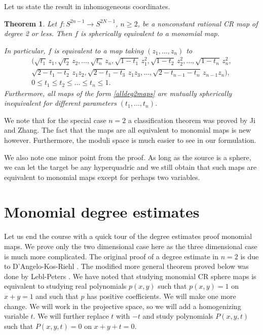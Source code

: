 \documentclass[12pt,openany]{book}
\newcommand{\sectionnewpage}{}
\theoremstyle{plain}
\newtheorem{thm}{Theorem}[section]
\theoremstyle{remark}
\theoremstyle{definition}
\theoremstyle{exercise}
\theoremstyle{example}
\begin{document}
Let us state the result in inhomogeneous coordinates.

\begin{thm} \label{thm:deg2class}
Let $f \colon S^{2n-1} \to S^{2N-1}$, $n \geq 2$, be a nonconstant
rational CR map
of degree 2 or less.  Then $f$ 
is spherically equivalent to a monomial map.

In particular, $f$ is equivalent to a map taking $(z_1,\ldots,z_n)$ to
\begin{multline} \label{alldeg2maps}
\bigl(
\sqrt{t_1} \, z_1 , 
\sqrt{t_2} \, z_2 , 
\ldots ,
\sqrt{t_n} \, z_n , 
\sqrt{1-t_1} \, z_1^2 , 
\sqrt{1-t_2} \, z_2^2 , 
\ldots ,
\sqrt{1-t_n} \, z_n^2 , 
\\
\sqrt{2-t_1-t_2} \, z_1z_2 , 
\sqrt{2-t_1-t_3} \, z_1z_3 , 
\ldots ,
\sqrt{2-t_{n-1}-t_n} \, z_{n-1}z_n \bigr) , 
\\
0 \leq t_1 \leq t_2 \leq \ldots \leq t_n \leq 1.
\end{multline}
Furthermore, all maps of the form \eqref{alldeg2maps} are mutually
spherically inequivalent for different parameters $(t_1,\ldots,t_n)$.
\end{thm}

We note that for the special case
$n=2$ a classification theorem was proved by Ji and Zhang.
The fact that the maps are all equivalent to monomial maps is new however.
Furthermore, the moduli space is much easier to see in our formulation.

We also note one minor point from the proof.  As long as the source is a
sphere, we can let the target be any hyperquadric and we still obtain that
such maps are equivalent to monomial maps except for perhaps two variables.


\sectionnewpage
\section{Monomial degree estimates}

Let us end the course with a quick tour of the degree estimates proof 
monomial maps.
We prove only the two dimensional case here as the three dimensional case
is much more complicated.
The original proof of a degree estimate in $n=2$
is due to D'Angelo-Kos-Riehl \cite{DKR}.
The
modified more general theorem proved below was done by Lebl-Peters \cite{LP}.
We have noted that studying monomial CR sphere maps
is equivalent to studying real polynomials $p(x,y)$
such that $p(x,y)=1$ on $x+y=1$ and such that $p$ has positive coefficients.
We will make one more change.  We will work in the projective space, so
we will add a homogenizing variable $t$.  We will further replace $t$ with
$-t$ and study polynomials $P(x,y,t)$ such that
$P(x,y,t) = 0$ on $x+y+t = 0$.
\end{document}
